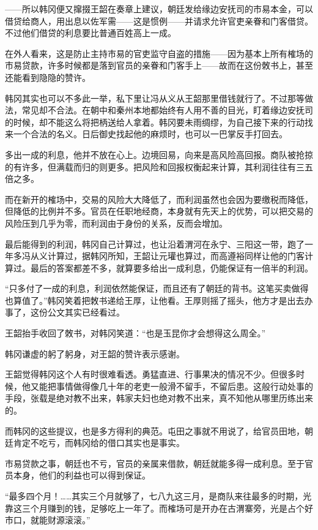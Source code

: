 ——所以韩冈便又撺掇王韶在奏章上建议，朝廷发给缘边安抚司的市易本金，可以借贷给商人，用出息以佐军需——这是惯例——并请求允许官吏亲眷和门客借贷。不过他们借贷的利息要比普通百姓高上一成。

在外人看来，这是防止主持市易的官吏监守自盗的措施——因为基本上所有榷场的市易贷款，许多时候都是落到官员的亲眷和门客手上——故而在这份敇书上，甚至还能看到隐隐的赞许。

韩冈其实也可以不多此一举，私下里让冯从义从王韶那里借钱就行了。不过那等做法，常见却不合法。在朝中和秦州本地都始终有人用不善的目光，盯着缘边安抚司的时候，却不能这么将把柄送给人拿着。韩冈要未雨绸缪，为自己接下来的行动找来一个合法的名义。日后御史找起他的麻烦时，也可以一巴掌反手打回去。

多出一成的利息，他并不放在心上。边境回易，向来是高风险高回报。商队被抢掠的有许多，但满载而归的则更多。把风险和回报权衡起来计算，其利润往往有三五倍之多。

而在新开的榷场中，交易的风险大大降低了，而利润虽然也会因为要缴税而降低，但降低的比例并不多。官员在任职地经商，本身就有先天上的优势，可以把交易的风险压到几乎为零，而利润由于身份的关系，反而会增加。

最后能得到的利润，韩冈自己计算过，也让沿着渭河在永宁、三阳这一带，跑了一年多冯从义计算过，据韩冈所知，王韶让元瓘也算过，而高遵裕同样让他的门客计算过。最后的答案都差不多，就算要多给出一成利息，仍能保证有一倍半的利润。

“只多付了一成的利息，利润依然能保证，而且还有了朝廷的背书。这笔买卖做得也算值了。”韩冈笑着把敇书递给王厚，让他看。王厚则摇了摇头，他方才是出去办事了，这份公文其实已经看过。

王韶抬手收回了敇书，对韩冈笑道：“也是玉昆你才会想得这么周全。”

韩冈谦虚的躬了躬身，对王韶的赞许表示感谢。

王韶觉得韩冈这个人有时很难看透。勇猛直进、行事果决的情况不少。但很多时候，他又能把事情做得像几十年的老吏一般滑不留手，不留后患。这般行动处事的手段，张载是绝对教不出来，韩家夫妇也绝对教不出来，真不知他从哪里历练出来的。

而韩冈的这些提议，也是多方得利的典范。屯田之事就不用说了，给官员田地，朝廷肯定不吃亏，而韩冈给的借口其实也是事实。

市易贷款之事，朝廷也不亏，官员的亲属来借款，朝廷就能多得一成利息。至于官员本身，他们的利益也可以得到保证。

“最多四个月！……其实三个月就够了，七八九这三月，是商队来往最多的时期，光靠这三个月赚到的钱，足够吃上一年了。而榷场可是开办在古渭寨旁，光是占个好市口，就能财源滚滚。”

